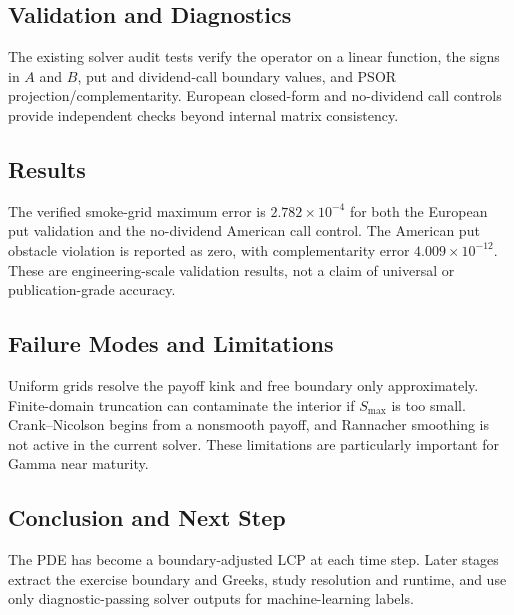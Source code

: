 \subsection{Validation and Diagnostics}
The existing solver audit tests verify the operator on a linear function, the
signs in \(A\) and \(B\), put and dividend-call boundary values, and PSOR
projection/complementarity. European closed-form and no-dividend call controls
provide independent checks beyond internal matrix consistency.

\subsection{Results}
The verified smoke-grid maximum error is \(2.782\times10^{-4}\) for both the
European put validation and the no-dividend American call control. The American
put obstacle violation is reported as zero, with complementarity error
\(4.009\times10^{-12}\). These are engineering-scale validation results, not a
claim of universal or publication-grade accuracy.

\subsection{Failure Modes and Limitations}
Uniform grids resolve the payoff kink and free boundary only approximately.
Finite-domain truncation can contaminate the interior if \(S_{\max}\) is too
small. Crank--Nicolson begins from a nonsmooth payoff, and Rannacher smoothing
is not active in the current solver. These limitations are particularly
important for Gamma near maturity.

\subsection{Conclusion and Next Step}
The PDE has become a boundary-adjusted LCP at each time step. Later stages
extract the exercise boundary and Greeks, study resolution and runtime, and use
only diagnostic-passing solver outputs for machine-learning labels.
